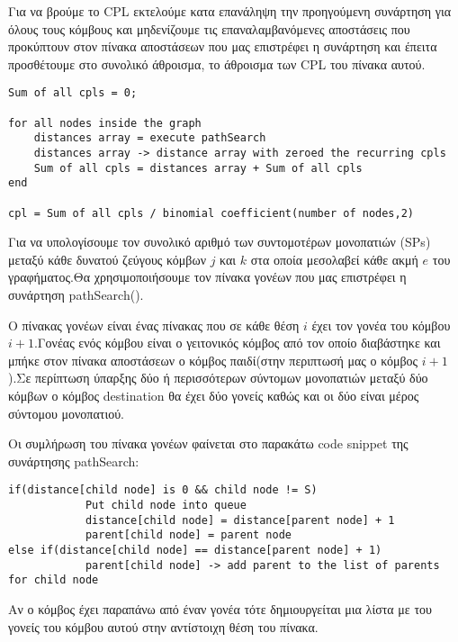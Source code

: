 \documentclass{article}
\begin{document}
Για να βρούμε το CPL εκτελούμε κατα επανάληψη την προηγούμενη συνάρτηση για όλους τους κόμβους και μηδενίζουμε τις επαναλαμβανόμενες αποστάσεις που προκύπτουν στον πίνακα αποστάσεων που μας επιστρέφει η συνάρτηση και έπειτα προσθέτουμε στο συνολικό άθροισμα, το άθροισμα των CPL του πίνακα αυτού.\pagebreak

\begin{lstlisting}
Sum of all cpls = 0;

for all nodes inside the graph
	distances array = execute pathSearch
	distances array -> distance array with zeroed the recurring cpls
	Sum of all cpls = distances array + Sum of all cpls
end

cpl = Sum of all cpls / binomial coefficient(number of nodes,2)
\end{lstlisting}\bigbreak
{}

Για να υπολογίσουμε τον συνολικό αριθμό των συντομοτέρων μονοπατιών (SPs) μεταξύ κάθε δυνατού ζεύγους κόμβων $j$ και $k$ στα οποία μεσολαβεί κάθε ακμή $e$ του γραφήματος.Θα χρησιμοποιήσουμε τον πίνακα γονέων που μας επιστρέφει η συνάρτηση
pathSearch().\bigbreak

Ο πίνακας γονέων είναι ένας πίνακας που σε κάθε θέση $i$ έχει τον γονέα του κόμβου $i+1$.Γονέας ενός κόμβου είναι ο γειτονικός κόμβος από τον οποίο διαβάστηκε και μπήκε στον πίνακα αποστάσεων ο κόμβος παιδί(στην περιπτωσή μας ο κόμβος $i+1$).Σε περίπτωση ύπαρξης δύο ή περισσότερων σύντομων μονοπατιών μεταξύ δύο κόμβων ο κόμβος destination θα έχει δύο γονείς καθώς και οι δύο είναι μέρος σύντομου μονοπατιού.\bigbreak

Οι συμλήρωση του πίνακα γονέων φαίνεται στο παρακάτω code snippet της συνάρτησης pathSearch:

\begin{lstlisting}
if(distance[child node] is 0 && child node != S)
			Put child node into queue
			distance[child node] = distance[parent node] + 1
			parent[child node] = parent node
else if(distance[child node] == distance[parent node] + 1)
			parent[child node] -> add parent to the list of parents for child node
\end{lstlisting}\bigbreak
{}
\bigbreak
Αν ο κόμβος έχει παραπάνω από έναν γονέα τότε δημιουργείται μια λίστα με του γονείς του κόμβου αυτού στην αντίστοιχη θέση του πίνακα.\bigbreak
\end{document}
